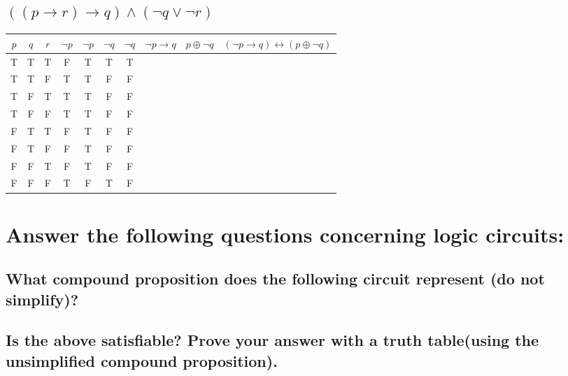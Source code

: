 \documentclass{article}
\begin{document}
    \subsection{\texorpdfstring{$((p \to r) \to q) \wedge (\neg q \vee \neg r)$}{((p → r) → q) ∧ (¬q ∨ ¬r)}} 
        \begin{center}
        \begin{tabular}{|c|c|c|c|c|c|c|c|c|c|}
            \hline
            $p$ & $q$ & $r$ & $\neg p$& $\neg p$ & $\neg q$ & $\neg q$ & $\neg p \to q$ & $p \oplus \neg q$ & $(\neg p \to q) \leftrightarrow (p \oplus \neg q)$ \\
            \hline
            T & T & T & F & T & T & T & \\
            T & T & F & T & T & F & F & \\
            T & F & T & T & T & F & F & \\  
            T & F & F & T & T & F & F & \\
            F & T & T & F & T & F & F & \\
            F & T & F & F & T & F & F & \\
            F & F & T & F & T & F & F & \\
            F & F & F & T & F & T & F & \\
            \hline
        \end{tabular}
    \end{center}

\section{Answer the following questions concerning logic circuits:}
    \subsection{What compound proposition does the following circuit represent (do not simplify)?} 
    \subsection{Is the above satisfiable? Prove your answer with a truth table(using the unsimplified compound proposition).} 
\end{document}
